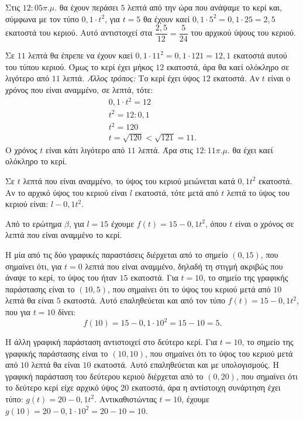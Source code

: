 
\begin{alist}
\item
\begin{rlist}
\item Στις $12:05\pi.\mu.$ θα έχουν περάσει $5$ λεπτά από την ώρα που ανάψαμε το κερί και,
σύμφωνα με τον τύπο $0,1 \cdot t^2$, για $t = 5$ θα έχουν καεί $0,1 \cdot 5^2 = 0,1 \cdot 25 = 2,5$
εκατοστά του κεριού.
Αυτό αντιστοιχεί στα $\dfrac{2,5}{12} = \dfrac{5}{24}$ του αρχικού ύψους του κεριού.
\item Σε $11$ λεπτά θα έπρεπε να έχουν καεί $0,1 \cdot 11^2 = 0,1 \cdot 121 = 12,1$ εκατοστά αυτού
του τύπου κεριού. Όμως το κερί έχει μήκος $12$ εκατοστά, άρα θα καεί ολόκληρο σε
λιγότερο από $11$ λεπτά.
\textit{Άλλος τρόπος:}
Το κερί έχει ύψος $12$ εκατοστά. Αν $t$ είναι ο χρόνος που είναι αναμμένο, σε λεπτά, τότε:
\begin{gather*}
0,1 \cdot t^2 = 12 \\
t^2 = 12 : 0,1 \\
t^2 = 120 \\
t = \sqrt{120} < \sqrt{121} = 11.
\end{gather*}
Ο χρόνος $t$ είναι κάτι λιγότερο από $11$ λεπτά.
Άρα στις $12:11\pi.\mu.$ θα έχει καεί ολόκληρο το κερί.
\end{rlist}

\item Σε $t$ λεπτά που είναι αναμμένο, το ύψος του κεριού μειώνεται κατά $0,1t^2$ εκατοστά. Αν
το αρχικό ύψος του κεριού είναι $l$ εκατοστά, τότε μετά από $t$ λεπτά το ύψος του κεριού
είναι:
$l - 0,1t^2$.

\item
\begin{rlist}
\item Από το ερώτημα $\beta$, για $l = 15$ έχουμε $f(t) = 15 - 0,1t^2$, όπου $t$ είναι ο χρόνος σε
λεπτά που είναι αναμμένο το κερί.

\item Η μία από τις δύο γραφικές παραστάσεις διέρχεται από το σημείο $(0, 15)$, που
σημαίνει ότι, για $t = 0$ λεπτά που είναι αναμμένο, δηλαδή τη στιγμή ακριβώς που
άναψε το κερί, το ύψος του ήταν $15$ εκατοστά. Για $t = 10$, το σημείο της γραφικής παράστασης είναι το $(10, 5)$, που σημαίνει ότι το ύψος του κεριού μετά από $10$ λεπτά θα είναι $5$ εκατοστά.
Αυτό επαληθεύεται και από τον τύπο $f(t) = 15 - 0,1t^2$, που για $t = 10$ δίνει:
\[f(10) = 15 - 0,1 \cdot 10^2 = 15 - 10 = 5.\]

Η άλλη γραφική παράσταση αντιστοιχεί στο δεύτερο κερί. Για $t = 10$, το σημείο της γραφικής παράστασης είναι το $(10, 10)$, που σημαίνει ότι το ύψος του κεριού μετά από
$10$ λεπτά θα είναι $10$ εκατοστά.
Αυτό επαληθεύεται και με υπολογισμούς.
Η γραφική παράσταση του δεύτερου κεριού διέρχεται από το $(0, 20)$, που σημαίνει ότι
το δεύτερο κερί είχε αρχικό ύψος $20$ εκατοστά, άρα η αντίστοιχη συνάρτηση έχει τύπο:
$g(t) = 20 - 0,1t^2$.
Αντικαθιστώντας $t = 10$, έχουμε $g(10) = 20 - 0,1 \cdot 10^2 = 20 - 10 = 10$.
\end{rlist}
\end{alist}

